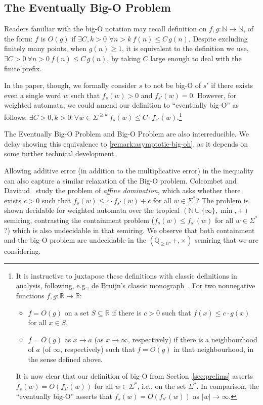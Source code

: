\documentclass{lmcs}
\theoremstyle{plain}
\theoremstyle{definition}
\theoremstyle{remark}
\renewcommand\nu{f}
\begin{document}
\subsection{The Eventually Big-O Problem}
\label{remark:asymptotic-big-oh:first}
Readers familiar with the big-O notation may recall definition on $f,g:\mathbb{N} \to \mathbb{N}$, of the form:
$f$ is $O(g)$ if $\exists C,k>0 $ $\forall n > k \  f(n) \le C\, g(n)$.
Despite excluding finitely many points, when $g(n)\ge 1$, it is equivalent to the definition we use,
$\exists {C > 0}\  \forall {n > 0} \  f(n) \le C\, g(n)$, by taking  $C$ large enough to deal with the finite prefix.

In the paper, though, we formally consider $s$ to not be big-O of $s'$ if there exists even a single word $w$ such that $\nu_s(w) > 0$ and $\nu_{s'}(w) = 0$.
However, for weighted automata, we could amend our definition to ``eventually big-O'' as follows: $\exists C> 0, k> 0 :  \forall w \in \Sigma^{\ge k} \ \nu_s(w) \le C \cdot \nu_{s'}(w)$.\footnote{It is instructive to juxtapose these definitions with classic definitions
in analysis,
following, e.g., de Bruijn's classic monograph~\cite[Section~1.2]{deBruijn}.
For two nonnegative functions $f, g \colon \mathbb{R} \to \mathbb{R}$:
\begin{itemize}[---]
\item
$f=O(g)$ on a set $S \subseteq \mathbb{R}$ if there is $c>0$ such that
$f(x) \le c \cdot g(x)$ for all $x \in S$,
\item
$f=O(g)$ as $x \to a$ (as $x \to \infty$, respectively)
if there is a neighbourhood of $a$ (of $\infty$, respectively)
such that $f=O(g)$ in that neighbourhood, in the sense defined above.
\end{itemize}
It is now clear that our definition of big-O from Section~\ref{sec:prelims}
asserts $\nu_s(w) = O(\nu_{s'}(w))$ for all $w\in \Sigma^*$,
i.e., on the set $\Sigma^*$.
In comparison, the ``eventually big-O'' asserts that
$\nu_s(w) = O(\nu_{s'}(w))$ as $|w| \to \infty$.
}

The Eventually Big-O Problem and Big-O Problem are also interreducible. We delay showing this equivalence to \cref{remark:asymptotic-big-oh}, as it depends on some further technical development.

Allowing additive error (in addition to the multiplicative error) in the inequality can also capture a similar relaxation of the Big-O problem.
Colcombet and Daviaud~\cite{ColcombetD13} study the problem of \emph{affine domination}, which asks whether there exists $c>0$ such that  $f_{s}(w) \le c\cdot f_{s'}(w) + c$ for all $w\in\Sigma^*$? 
The problem is shown decidable for weighted automata over the tropical  $(\mathbb{N}\cup\{\infty\},\min,+)$ semiring, contrasting the containment problem ($f_{s}(w) \le  f_{s'}(w)$ for all $w\in\Sigma^*$?) which is also undecidable in that semiring. 
We observe that both containment and the big-O problem are undecidable in the $(\mathbb{Q}_{\ge0},+,\times)$ semiring that we are considering.
\end{document}
